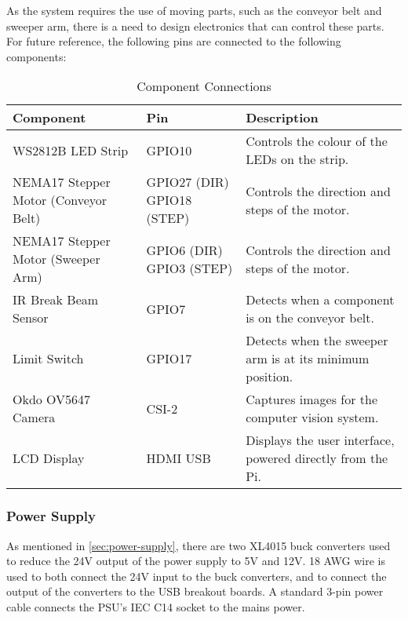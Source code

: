 As the system requires the use of moving parts, such as the conveyor belt and sweeper arm, there is a need to design electronics that can control these parts. For future reference, the following pins are connected to the following components:

\begin{table}[H]
    \centering
    {\fontsize{10pt}{12pt}\selectfont
    \begin{tabularx}{\textwidth}{|p{4cm}|p{4cm}|X|}
        \hline
        \textbf{Component} & \textbf{Pin} & \textbf{Description} \\
        \hline
        WS2812B LED Strip & GPIO10 & Controls the colour of the LEDs on the strip. \\
        \hline
        NEMA17 Stepper Motor (Conveyor Belt) & GPIO27 (DIR) \newline GPIO18 (STEP) & Controls the direction and steps of the motor. \\
        \hline
        NEMA17 Stepper Motor (Sweeper Arm) & GPIO6 (DIR) \newline GPIO3 (STEP) & Controls the direction and steps of the motor. \\
        \hline
        IR Break Beam Sensor & GPIO7 & Detects when a component is on the conveyor belt. \\
        \hline
        Limit Switch & GPIO17 & Detects when the sweeper arm is at its minimum position. \\
        \hline
        Okdo OV5647 Camera & CSI-2 & Captures images for the computer vision system. \\
        \hline
        LCD Display & HDMI \newline USB & Displays the user interface, powered directly from the Pi. \\
        \hline
    \end{tabularx}
    }
    \caption{Component Connections}
    \label{tab:component-connections}
\end{table}


\subsubsection{Power Supply}

As mentioned in \autoref{sec:power-supply}, there are two XL4015 buck converters used to reduce the 24V output of the power supply to 5V and 12V. 18 AWG wire is used to both connect the 24V input to the buck converters, and to connect the output of the converters to the USB breakout boards. A standard 3-pin power cable connects the PSU's IEC C14 socket to the mains power.
